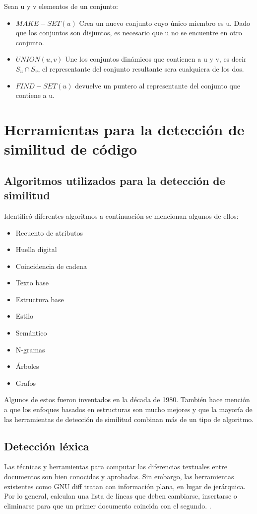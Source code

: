 \noindent Sean u y v elementos de un conjunto:
\begin{itemize}
    \item $MAKE-SET(u)$ Crea un nuevo conjunto cuyo único miembro es u. Dado que los conjuntos son disjuntos, es necesario que u no se encuentre en otro conjunto.
    \item $UNION(u, v)$ Une los conjuntos dinámicos que contienen a u y v, es decir $S_u \cap S_v$, el representante del conjunto resultante sera cualquiera de los dos.
    \item $FIND-SET(u)$ devuelve un puntero al representante del conjunto que contiene a u.
\end{itemize}

\section{Herramientas para la detección de similitud de código}
\subsection{Algoritmos utilizados para la detección de similitud}
\cite{Novak2019} Identificó diferentes algoritmos a continuación se mencionan algunos de ellos:
\begin{itemize}
    \item Recuento de atributos
    \item Huella digital
    \item Coincidencia de cadena
    \item Texto base
    \item Estructura base
    \item Estilo
    \item Semántico
    \item N-gramas
    \item Árboles
    \item Grafos
\end{itemize}
Algunos de estos fueron inventados en la década de 1980. También hace mención a que los enfoques basados en estructuras son mucho mejores y que la mayoría de las herramientas de detección de similitud combinan más de un tipo de algoritmo.
\subsection{Detección léxica}
Las técnicas y herramientas para computar las diferencias textuales entre documentos son bien conocidas y aprobadas. Sin embargo, las herramientas existentes como GNU diff tratan con información plana, en lugar de jerárquica. Por lo general, calculan una lista de líneas que deben cambiarse, insertarse o eliminarse para que un primer documento coincida con el segundo. \cite{ChangeDistiller}.
